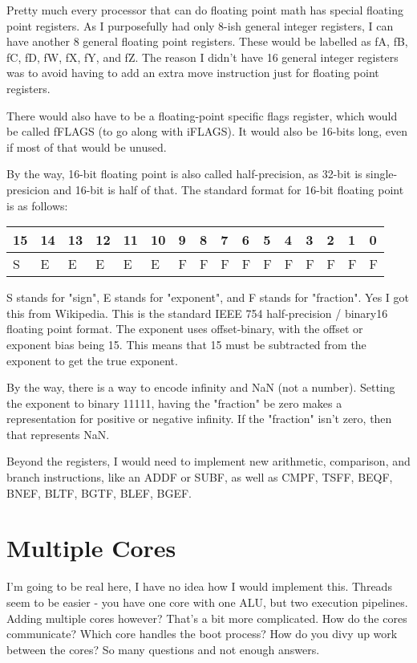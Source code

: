 \documentclass[letterpaper,12pt]{book}
\begin{document}
Pretty much every processor that can do floating point math has special floating point registers. As I purposefully had only 8-ish general integer registers, I can have another 8 general floating point registers. These would be labelled as fA, fB, fC, fD, fW, fX, fY, and fZ. The reason I didn't have 16 general integer registers was to avoid having to add an extra move instruction just for floating point registers.

There would also have to be a floating-point specific flags register, which would be called fFLAGS (to go along with iFLAGS). It would also be 16-bits long, even if most of that would be unused.

By the way, 16-bit floating point is also called half-precision, as 32-bit is single-presicion and 16-bit is half of that. The standard format for 16-bit floating point is as follows:

\begin{tabular}{|l|l|l|l|l|l|l|l|l|l|l|l|l|l|l|l|}
\hline
	15 & 14 & 13 & 12 & 11 & 10 & 9 & 8 & 7 & 6 & 5 & 4 & 3 & 2 & 1 & 0\\
\hline
	S & E & E & E & E & E & F & F & F & F & F & F & F & F & F & F\\
\hline
\end{tabular}

S stands for "sign", E stands for "exponent", and F stands for "fraction". Yes I got this from Wikipedia. This is the standard IEEE 754 half-precision / binary16 floating point format. The exponent uses offset-binary, with the offset or exponent bias being 15. This means that 15 must be subtracted from the exponent to get the true exponent.

By the way, there is a way to encode infinity and NaN (not a number). Setting the exponent to binary 11111, having the "fraction" be zero makes a representation for positive or negative infinity. If the "fraction" isn't zero, then that represents NaN.

Beyond the registers, I would need to implement new arithmetic, comparison, and branch instructions, like an ADDF or SUBF, as well as CMPF, TSFF, BEQF, BNEF, BLTF, BGTF, BLEF, BGEF.

\section{Multiple Cores}

I'm going to be real here, I have no idea how I would implement this. Threads seem to be easier - you have one core with one ALU, but two execution pipelines. Adding multiple cores however? That's a bit more complicated. How do the cores communicate? Which core handles the boot process? How do you divy up work between the cores? So many questions and not enough answers.
\end{document}
